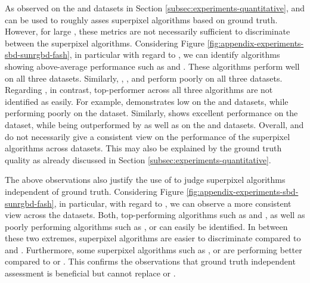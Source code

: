 As observed on the \BSDS and \NYU datasets in Section \ref{subsec:experiments-quantitative},
\Rec and \UE can be used to roughly asses superpixel algorithms based on ground
truth. However, for large \K, these metrics are not necessarily
sufficient to discriminate between the superpixel algorithms. Considering Figure
\ref{fig:appendix-experiments-sbd-sunrgbd-fash}, in particular with regard to
\Rec, we can identify algorithms showing above-average performance such as \ETPS
and \SEEDS. These algorithms perform well on all three datasets. Similarly,
\PF, \QS, \SEAW and \TPS perform poorly on all three datasets. Regarding \UE,
in contrast, top-performer across all three algorithms are not identified as easily.
For example, \POISE demonstrates low \UE on the \SBD and \Fash datasets, while performing
poorly on the \SUNRGBD dataset. Similarly, \ERS shows excellent performance on the \SUNRGBD dataset,
while being outperformed by \POISE as well as \ETPS on the \SBD and \Fash datasets.
Overall, \Rec and \UE do not necessarily give a consistent
view on the performance of the superpixel algorithms across datasets. This may also
be explained by the ground truth quality as already discussed in Section \ref{subsec:experiments-quantitative}.

The above observations also justify the use of \EV to judge superpixel algorithms
independent of ground truth. Considering Figure \ref{fig:appendix-experiments-sbd-sunrgbd-fash},
in particular, with regard to \EV, we can observe a more consistent view across the datasets.
Both, top-performing algorithms such as \ETPS and \SEEDS, as well as poorly performing
algorithms such as \PF, \PB or \TPS can easily be identified. In between these two extremes,
superpixel algorithms are easier to discriminate compared to \Rec and \UE. Furthermore,
some superpixel algorithms such as \QS, \FH or \CIS are performing better compared to
\Rec or \UE. This confirms the observations that ground truth independent assessment
is beneficial but cannot replace \Rec or \UE.

